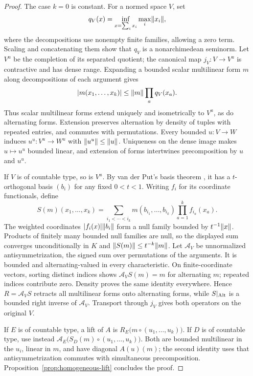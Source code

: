 \begin{proof}
The case $k=0$ is constant. For a normed space $V$, set
\[
 q_V(x)=\inf_{x=\sum_i x_i}\max_i\lVert x_i\rVert,
\]
where the decompositions use nonempty finite families, allowing a zero term. Scaling and concatenating them show that
$q_V$ is a nonarchimedean seminorm. Let $V^u$ be the completion of its separated quotient;
the canonical map $j_V\colon V\to V^u$ is contractive and has dense range.
Expanding a bounded scalar multilinear form $m$ along decompositions of each argument gives
\[
 \lvert m(x_1,\ldots,x_k)\rvert\le\lVert m\rVert\prod_a q_V(x_a).
\]
Thus scalar multilinear forms extend uniquely and isometrically to $V^u$, as do
alternating forms. Extension preserves alternation by density of tuples with repeated
entries, and commutes with permutations. Every bounded $u\colon V\to W$ induces
$u^u\colon V^u\to W^u$ with $\lVert u^u\rVert\le\lVert u\rVert$. Uniqueness on the dense image makes
$u\mapsto u^u$ bounded linear, and extension of forms intertwines precomposition by $u$ and $u^u$.

If $V$ is of countable type, so is $V^u$. By van der Put's basis theorem
\cite[Proposition~1.4]{VdP}, it has a $t$\nobreakdash-orthogonal basis $(b_i)$ for any
fixed $0<t<1$. Writing $f_i$ for its coordinate functionals, define
\[
 S(m)(x_1,\ldots,x_k)
 =\sum_{i_1<\cdots<i_k}m(b_{i_1},\ldots,b_{i_k})
                        \prod_{a=1}^k f_{i_a}(x_a).
\]
The weighted coordinates $\lvert f_i(x)\rvert\lVert b_i\rVert$ form a null family bounded by
$t^{-1}\lVert x\rVert$. Products of finitely many bounded null families are null, so the
displayed sum converges unconditionally in $K$ and $\lVert S(m)\rVert\le t^{-k}\lVert m\rVert$.
Let $\mathcal A_V$ be unnormalized antisymmetrization, the signed sum over permutations
of the arguments. It is bounded and alternating-valued in every characteristic.
On finite-coordinate vectors, sorting distinct indices shows
$\mathcal A_V S(m)=m$ for alternating $m$; repeated indices contribute zero.
Density proves the same identity everywhere. Hence $R=\mathcal A_V S$ retracts all
multilinear forms onto alternating forms, while $S|_{\operatorname{Alt}}$ is a bounded right inverse
of $\mathcal A_V$. Transport through $j_V$ gives both operators on the original $V$.

If $E$ is of countable type, a lift of $A$ is
$R_E\bigl(m\circ(u_1,\ldots,u_k)\bigr)$.
If $D$ is of countable type, use instead
$\mathcal A_E\bigl(S_D(m)\circ(u_1,\ldots,u_k)\bigr)$.
Both are bounded multilinear in the $u_i$, linear in $m$, and have diagonal $A(u)(m)$;
the second identity uses that antisymmetrization commutes with simultaneous precomposition.
Proposition~\ref{prop:homogeneous-lift} concludes the proof.
\end{proof}


